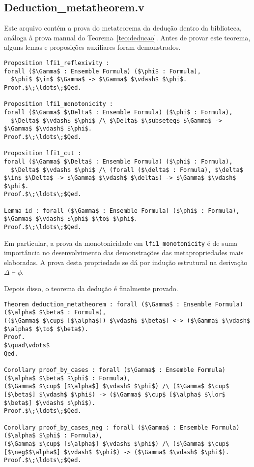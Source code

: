           \subsection{Deduction\_metatheorem.v}

            Este arquivo contém a prova do metateorema da dedução dentro da biblioteca, análoga à prova manual do Teorema~\ref{teo:deducao}. Antes de provar este teorema, alguns lemas e proposições auxiliares foram demonstrados.
          
          \begin{lstlisting}[name=Deduction, frame=single, language=coq]
Proposition lfi1_reflexivity : 
forall ($\Gamma$ : Ensemble Formula) ($\phi$ : Formula),
  $\phi$ $\in$ $\Gamma$ -> $\Gamma$ $\vdash$ $\phi$.
Proof.$\;\ldots\;$Qed.

Proposition lfi1_monotonicity :
forall ($\Gamma$ $\Delta$ : Ensemble Formula) ($\phi$ : Formula),
  $\Delta$ $\vdash$ $\phi$ /\ $\Delta$ $\subseteq$ $\Gamma$ -> $\Gamma$ $\vdash$ $\phi$.
Proof.$\;\ldots\;$Qed.

Proposition lfi1_cut :
forall ($\Gamma$ $\Delta$ : Ensemble Formula) ($\phi$ : Formula),
  $\Delta$ $\vdash$ $\phi$ /\ (forall ($\delta$ : Formula), $\delta$ $\in$ $\Delta$ -> $\Gamma$ $\vdash$ $\delta$) -> $\Gamma$ $\vdash$ $\phi$.
Proof.$\;\ldots\;$Qed.

Lemma id : forall ($\Gamma$ : Ensemble Formula) ($\phi$ : Formula), $\Gamma$ $\vdash$ $\phi$ $\to$ $\phi$.
Proof.$\;\ldots\;$Qed.

          \end{lstlisting}

          Em particular, a prova da monotonicidade em \texttt{lfi1\_monotonicity} é de suma importância no desenvolvimento das demonstrações das metapropriedades mais elaboradas. A prova desta propriedade se dá por indução estrutural na derivação $\Delta \vdash \phi$.

          Depois disso, o teorema da dedução é finalmente provado.

          \begin{lstlisting}[name=Deduction, frame=single, language=coq]
Theorem deduction_metatheorem : forall ($\Gamma$ : Ensemble Formula) ($\alpha$ $\beta$ : Formula), 
(($\Gamma$ $\cup$ [$\alpha$]) $\vdash$ $\beta$) <-> ($\Gamma$ $\vdash$ $\alpha$ $\to$ $\beta$).
Proof. 
$\quad\vdots$
Qed.

Corollary proof_by_cases : forall ($\Gamma$ : Ensemble Formula) ($\alpha$ $\beta$ $\phi$ : Formula), 
($\Gamma$ $\cup$ [$\alpha$] $\vdash$ $\phi$) /\ ($\Gamma$ $\cup$ [$\beta$] $\vdash$ $\phi$) -> ($\Gamma$ $\cup$ [$\alpha$ $\lor$ $\beta$] $\vdash$ $\phi$).
Proof.$\;\ldots\;$Qed.
  
Corollary proof_by_cases_neg : forall ($\Gamma$ : Ensemble Formula) ($\alpha$ $\phi$ : Formula), 
($\Gamma$ $\cup$ [$\alpha$] $\vdash$ $\phi$) /\ ($\Gamma$ $\cup$ [$\neg$$\alpha$] $\vdash$ $\phi$) -> ($\Gamma$ $\vdash$ $\phi$).
Proof.$\;\ldots\;$Qed.
          \end{lstlisting}

